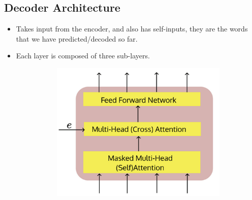 \documentclass[a4paper]{article}
\begin{document}
\subsection{Decoder Architecture}
\begin{itemize}
    \item Takes input from the encoder, and also has self-inputs, they are the words that we have predicted/decoded so far.
    \item Each layer is composed of three sub-layers.
    \begin{figure}[H]
        \centering
        \begin{subfigure}[b]{0.45\textwidth}
            \centering
            \includegraphics[width=\linewidth]{Degree//static/DL_decoder_block.png}
        \end{subfigure}
        \hfill
        \begin{subfigure}[b]{0.45\textwidth}
            \centering

\end{subfigure}
\end{figure}
\end{itemize}
\end{document}
